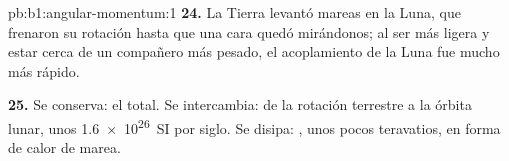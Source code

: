 \begin{solution}{pb:b1:angular-momentum:1}
\textbf{24.} La Tierra levantó mareas en la Luna, que frenaron su rotación
hasta que una cara quedó mirándonos; al ser más ligera y estar cerca de un
compañero más pesado, el acoplamiento de la Luna fue mucho más rápido.

\textbf{25.} Se conserva: el  total. Se intercambia:
 de la rotación terrestre a la órbita lunar, unos
\qty{1.6e26}{SI} por siglo. Se disipa: , unos pocos
teravatios, en forma de calor de marea.
\end{solution}
